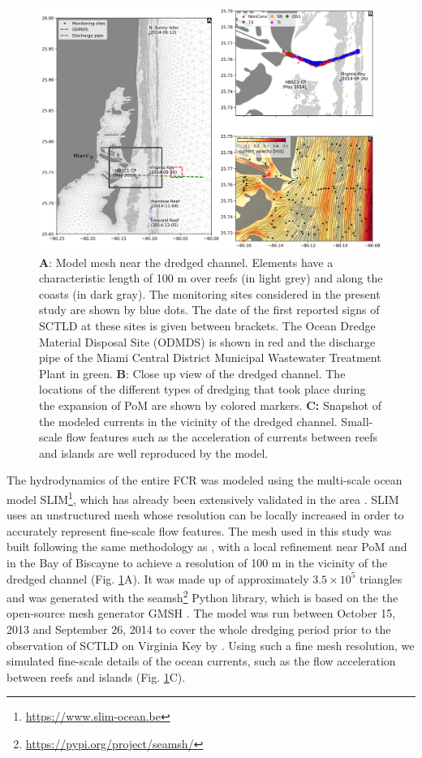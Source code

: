\begin{figure}
	\centering
	\includegraphics[width=\textwidth]{chapters/onset/figures/fig_mesh_onset.png}
	\caption{\textbf{A}: Model mesh near the dredged channel. Elements have a characteristic length of 100 m over reefs (in light grey) and along the coasts (in dark gray). The monitoring sites considered in the present study are shown by blue dots. The date of the first reported signs of SCTLD at these sites is given between brackets. The Ocean Dredge Material Disposal Site (ODMDS) is shown in red and the discharge pipe of the Miami Central District Municipal Wastewater Treatment Plant in green. \textbf{B}: Close up view of the dredged channel. The locations of the different types of dredging that took place during the expansion of PoM are shown by colored markers. \textbf{C:} Snapshot of the modeled currents in the vicinity of the dredged channel. Small-scale flow features such as the acceleration of currents between reefs and islands are well reproduced by the model.}
	\label{fig:onset_mesh}
\end{figure}

The hydrodynamics of the entire FCR was modeled using the multi-scale ocean model SLIM\footnote{\url{ https://www.slim-ocean.be}}, which has already been extensively validated in the area \citep{frys2020fine,dobbelaere2020coupled,dobbelaere2022connecting}. SLIM uses an unstructured mesh whose resolution can be locally increased in order to accurately represent fine-scale flow features. The mesh used in this study was built following the same methodology as \cite{dobbelaere2020coupled}, with a local refinement near PoM and in the Bay of Biscayne to achieve a resolution of 100 m in the vicinity of the dredged channel (Fig. \ref{fig:onset_mesh}A). It was made up of approximately $3.5\times 10^5$ triangles and was generated with the seamsh\footnote{\url{https://pypi.org/project/seamsh/}} Python library, which is based on the the open-source mesh generator GMSH \citep{geuzaine2009gmsh}. The model was run between October 15, 2013 and September 26, 2014 to cover the whole dredging period prior to the observation of SCTLD on Virginia Key by \cite{precht2016unprecedented}. Using such a fine mesh resolution, we simulated fine-scale details of the ocean currents, such as the flow acceleration between reefs and islands (Fig. \ref{fig:onset_mesh}C).


